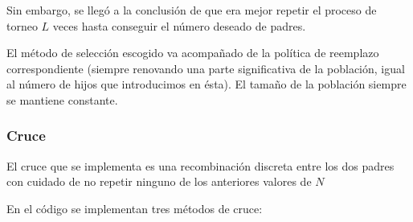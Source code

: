 \documentclass[12pt]{article}
\begin{document}
Sin embargo, se llegó a la conclusión de que era mejor repetir el proceso de torneo $L$ veces hasta conseguir el número deseado de padres.

El método de selección escogido va acompañado de la política de reemplazo correspondiente (siempre renovando una parte significativa de la población, igual al número de hijos que introducimos en ésta). El tamaño de la población siempre se mantiene constante.

\subsubsection{Cruce}

El cruce que se implementa es una recombinación discreta entre los dos padres con cuidado de no repetir ninguno de los anteriores valores de $N$ 

En el código se implementan tres métodos de cruce:
\end{document}
